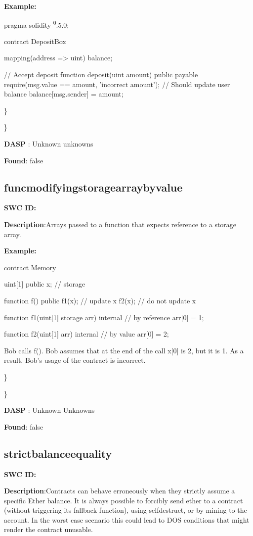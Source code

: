 \documentclass{article}
\begin{document}
{\textbf{Example:} 

pragma solidity \textsuperscript0.5.0;

contract DepositBox {
    mapping(address => uint) balance;

    // Accept deposit
    function deposit(uint amount) public payable {
        require(msg.value == amount, 'incorrect amount');
        // Should update user balance
        balance[msg.sender] = amount;
    }
}

\} 

\} 

\textbf{DASP} : Unknown unknowns

\textbf{Found}: false

\subsection{func\textunderscore modifying\textunderscore storage\textunderscore array\textunderscore by\textunderscore value} 
\textbf{SWC \textunderscore ID:} 

\textbf{Description}:Arrays passed to a function that expects reference to a storage array.


\textbf{Example:} 

contract Memory {
    uint[1] public x; // storage

    function f() public {
        f1(x); // update x
        f2(x); // do not update x
    }

    function f1(uint[1] storage arr) internal { // by reference
        arr[0] = 1;
    }

    function f2(uint[1] arr) internal { // by value
        arr[0] = 2;
    }
}

Bob calls f(). Bob assumes that at the end of the call x[0] is 2, but it is 1. As a result, Bob's usage of the contract is incorrect.

\} 

\} 

\textbf{DASP} : Unknown Unknowns

\textbf{Found}: false

\subsection{strict\textunderscore balance\textunderscore equality} 
\textbf{SWC \textunderscore ID:} 

\textbf{Description}:Contracts can behave erroneously when they strictly assume a specific Ether balance. It is always possible to forcibly send ether to a contract (without triggering its fallback function), using selfdestruct, or by mining to the account. In the worst case scenario this could lead to DOS conditions that might render the contract unusable.


}
\end{document}
